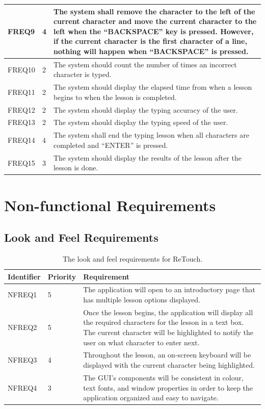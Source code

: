 \documentclass[12pt, titlepage]{article}
\begin{document}
\begin{longtable}{ |m{2cm}|m{1.8cm}|m{9.4cm}| }
    \hline
    FREQ9 & 4 & The system shall remove the character to the left of the current character and move the current character to the left when the “BACKSPACE” key is pressed. However, if the current character is the first character of a line, nothing will happen when “BACKSPACE” is pressed. \\ 
    \hline
    FREQ10 & 2 & The system should count the number of times an incorrect character is typed. \\ 
    \hline
    FREQ11 & 2 & The system should display the elapsed time from when a lesson begins to when the lesson is completed. \\ 
    \hline
    FREQ12 & 2 & The system should display the typing accuracy of the user. \\ 
    \hline
    FREQ13 & 2 & The system should display the typing speed of the user. \\ 
    \hline
    FREQ14 & 4 & The system shall end the typing lesson when all characters are completed and “ENTER” is pressed. \\ 
    \hline
    FREQ15 & 3 & The system should display the results of the lesson after the lesson is done. \\ 
    \hline

\end{longtable}

\section{Non-functional Requirements}
\subsection{Look and Feel Requirements}

\begin{table}[H]
  \caption{The look and feel requirements for ReTouch.}
\begin{tabular}{ |m{2cm}|m{1.8cm}|m{9.4cm}| }
    \hline
    \textbf{Identifier} & \textbf{Priority} & \textbf{Requirement} \\ 
    \hline
    NFREQ1 & 5 & The application will open to an introductory page that has multiple lesson options displayed. \\ 
    \hline
    NFREQ2 & 5 & Once the lesson begins, the application will display all the required characters for the lesson in a text box. The current character will be highlighted to notify the user on what character to enter next. \\ 
    \hline
    NFREQ3 & 4 & Throughout the lesson, an on-screen keyboard will be displayed with the current character being highlighted. \\ 
    \hline
    NFREQ4 & 3 & The GUI's components will be consistent in colour, text fonts, and window properties in order to keep the application organized and easy to navigate. \\ 
    \hline
\end{tabular}
\end{table}
\end{document}
